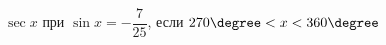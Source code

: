 \begin{ex}[type=simplify_calculate]
	\begin{condition}
		\( \sec x \) при \( \sin x=-\dfrac{7}{25} \), \quad если \( 270\degree<x<360\degree \)
	\end{condition}
\end{ex}